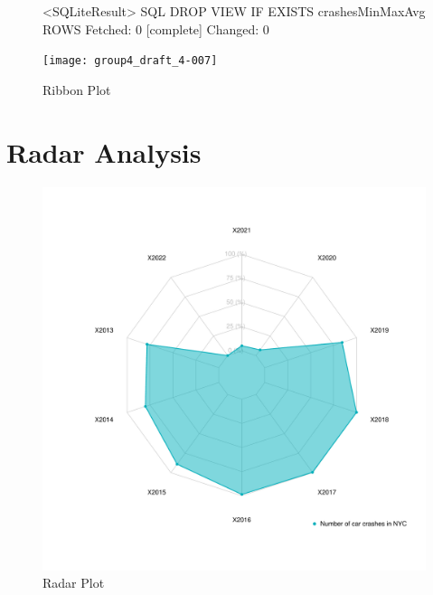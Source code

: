 \documentclass[10pt]{article}
\begin{document}
\begin{figure}[H]
\centering
\begin{Schunk}
\begin{Soutput}
<SQLiteResult>
  SQL  DROP VIEW IF EXISTS crashesMinMaxAvg
  ROWS Fetched: 0 [complete]
       Changed: 0
\end{Soutput}
\end{Schunk}
\texttt{[image: group4\_draft\_4-007]}
\caption{Ribbon Plot}
\end{figure}

\section{Radar Analysis}
\begin{figure}[H]
\centering
\includegraphics{group4_draft_4-008}
\caption{Radar Plot}
\end{figure}
\end{document}
